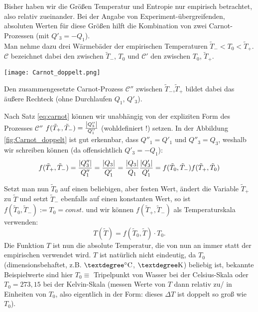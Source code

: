 \documentclass[../KlassMech_main.tex]{subfiles}
\begin{document}
Bisher haben wir die Größen Temperatur und Entropie nur empirisch betrachtet, also relativ zueinander. Bei der Angabe von Experiment-übergreifenden, absoluten Werten für diese Größen hilft die Kombination von zwei Carnot-Prozessen (mit $Q'_3 = -Q_1$).\\
Man nehme dazu drei Wärmebäder der empirischen Temperaturen $\tilde{T}_- < T_0 < \tilde{T}_+$. $\mathcal{C}$ bezeichnet dabei den zwischen $\tilde{T}_-$, $T_0$ und $\mathcal{C}'$ den zwischen $T_0$, $\tilde{T}_+$.
\begin{center}
\texttt{[image: Carnot\_doppelt.png]}
\label{fig:Carnot_doppelt}
\end{center}
Den zusammengesetzte Carnot-Prozess $\mathcal{C}''$ zwischen $\tilde{T}_-$,$\tilde{T}_+$ bildet dabei das äußere Rechteck (ohne Durchlaufen $Q_1$, $Q'_3$).

Nach Satz \eqref{eq:carnot} können wir unabhängig von der expliziten Form des Prozesses $\mathcal{C}''$ $f(\tilde{T}_+, \tilde{T}_-) = \frac{\abs{Q''_3}}{Q''_1}$ (wohldefiniert !) setzen. In der Abbildung \ref{fig:Carnot_doppelt} ist gut erkennbar, dass $Q''_1 = Q'_1$ und $Q''_3 = Q_3$, weshalb wir schreiben können (da offensichtlich $Q'_3 = -Q_1$):
\begin{equation}
f(\tilde{T}_+, \tilde{T}_-) = \frac{\abs{Q''_3}}{Q''_1} = \frac{\abs{Q_3}}{Q'_1} = \frac{\abs{Q_3}}{Q_1} \frac{\abs{Q'_3}}{Q'_1} = f(\tilde{T}_0, \tilde{T}_-) f(\tilde{T}_+, \tilde{T}_0)
\end{equation}

Setzt man nun $\tilde{T}_0$ auf einen beliebigen, aber festen Wert, ändert die Variable $\tilde{T}_+$ zu $\tilde{T}$ und setzt $\tilde{T}_-$ ebenfalls auf einen konstanten Wert, so ist $f(\tilde{T}_0, \tilde{T}_-) := T_0 = const.$ und wir können $f(\tilde{T}_+, \tilde{T}_-)$ als Temperaturskala verwenden:
\begin{equation}
T(\tilde{T}) = f(\tilde{T}_0, \tilde{T}) \cdot T_0 .
\end{equation}
Die Funktion $T$ ist nun die absolute Temperatur, die von nun an immer statt der empirischen verwendet wird. $T$ ist natürlich nicht eindeutig, da $T_0$ (dimensionsbehaftet, z.B. $°\celsius$, $°\kelvin$) beliebig ist, bekannte Beispielwerte sind hier $T_0 \equiv$ Tripelpunkt von Wasser bei der Celsius-Skala oder $T_0 = 273,15$ bei der Kelvin-Skala (messen Werte von $T$ dann relativ zu/ in Einheiten von $T_0$, also eigentlich in der Form: dieses $\Delta T$ ist doppelt so groß wie $T_0$).
\end{document}
